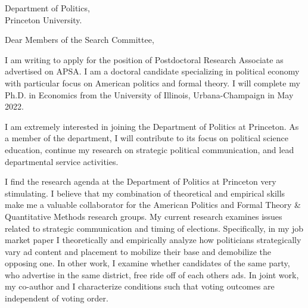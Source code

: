 \documentclass[12pt]{letter}
\begin{document}
\date{}
\begin{letter}{Department of Politics,\\
Princeton University.}

\opening{Dear Members of the Search Committee,}

I am writing to apply for the position of Postdoctoral Research Associate as advertised on APSA.
I am a doctoral candidate specializing in political economy with particular focus on American politics and formal theory.
I will complete my Ph.D. in Economics from the University of Illinois, Urbana-Champaign in May 2022. 

I am extremely interested in joining the Department of Politics at Princeton.
As a member of the department, I will contribute to its focus on political science education,
continue my research on strategic political communication, and lead departmental service activities.
%

I find the research agenda at the Department of Politics at Princeton very stimulating.
I believe that my combination of theoretical and empirical skills make me a valuable collaborator for the American Politics and Formal Theory \& Quantitative Methods research groups.
My current research examines issues related to strategic communication and timing of elections.
Specifically, in my job market paper I theoretically and empirically analyze how politicians strategically vary ad content and placement to mobilize their base and demobilize the opposing one.
In other work, I examine whether candidates of the same party, who advertise in the same district, free ride off of each others ads.
In joint work, my co-author and I characterize conditions such that voting outcomes are independent of voting order.


\end{letter}
\end{document}
